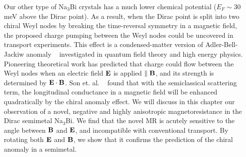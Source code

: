 Our other type of Na$_3$Bi crystals has a much lower chemical potential ($E_F \sim 30$ meV above the Dirac point). As a result, when the Dirac point is split into two chiral Weyl nodes by breaking the time-reversal symmetry in a magnetic field, the proposed charge pumping between the Weyl nodes could be uncovered in transport experiments\cite{Xiong2015b}. This effect is a condensed-matter version of Adler-Bell-Jackiw anomaly ~\cite{Nielsen1983,Wan2011,Burkov2011, Hosur2013} investigated in quantum field theory and high energy physics. Pioneering theoretical work has predicted that charge could flow between the Weyl nodes when an electric field $\bf E$ is applied $\parallel \bf B$, and its strength is determined by $\bf E\cdot \bf B$. Son et. al. ~\cite{Hosur2013} found that with the semiclassical scattering term, the longitudinal conductance in a magnetic field will be enhanced quadratically by the chiral anomaly effect. We will discuss in this chapter our observation of a novel, negative and highly anisotropic magnetoresistance in the Dirac semimetal Na$_3$Bi. We find that the novel MR is acutely sensitive to the angle between $\bf B$ and $\bf E$, and incompatible with conventional transport. By rotating both $\bf E$ and $\bf B$, we show that it confirms the prediction of the chiral anomaly in a semimetal. 







